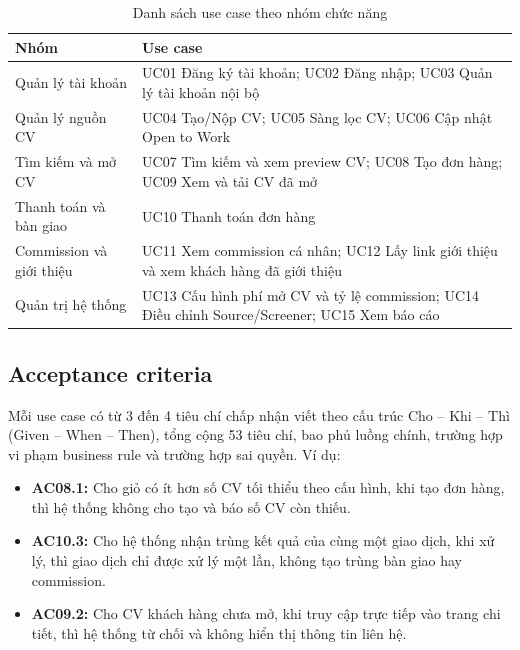 \documentclass[11pt,a4paper]{article}
\begin{document}
\begin{table}[!htbp]
\centering\small
\caption{Danh sách use case theo nhóm chức năng}\label{tab:uc}
\begin{tabularx}{\linewidth}{@{}p{3.6cm}L@{}}
\toprule
\textbf{Nhóm} & \textbf{Use case}\\\midrule
Quản lý tài khoản & UC01 Đăng ký tài khoản; UC02 Đăng nhập; UC03 Quản lý tài khoản nội bộ\\
Quản lý nguồn CV & UC04 Tạo/Nộp CV; UC05 Sàng lọc CV; UC06 Cập nhật Open to Work\\
Tìm kiếm và mở CV & UC07 Tìm kiếm và xem preview CV; UC08 Tạo đơn hàng; UC09 Xem và tải CV đã mở\\
Thanh toán và bàn giao & UC10 Thanh toán đơn hàng\\
Commission và giới thiệu & UC11 Xem commission cá nhân; UC12 Lấy link giới thiệu và xem khách hàng đã giới thiệu\\
Quản trị hệ thống & UC13 Cấu hình phí mở CV và tỷ lệ commission; UC14 Điều chỉnh Source/Screener; UC15 Xem báo cáo\\\bottomrule
\end{tabularx}
\end{table}

\subsection{Acceptance criteria}
Mỗi use case có từ 3 đến 4 tiêu chí chấp nhận viết theo cấu trúc Cho – Khi – Thì (Given – When – Then), tổng cộng 53 tiêu chí, bao phủ luồng chính, trường hợp vi phạm business rule và trường hợp sai quyền. Ví dụ:
\begin{itemize}
\item \textbf{AC08.1:} Cho giỏ có ít hơn số CV tối thiểu theo cấu hình, khi tạo đơn hàng, thì hệ thống không cho tạo và báo số CV còn thiếu.
\item \textbf{AC10.3:} Cho hệ thống nhận trùng kết quả của cùng một giao dịch, khi xử lý, thì giao dịch chỉ được xử lý một lần, không tạo trùng bàn giao hay commission.
\item \textbf{AC09.2:} Cho CV khách hàng chưa mở, khi truy cập trực tiếp vào trang chi tiết, thì hệ thống từ chối và không hiển thị thông tin liên hệ.
\end{itemize}
\end{document}
